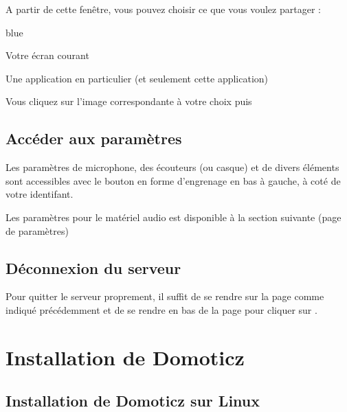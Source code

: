 {A partir de cette fenêtre, vous pouvez choisir ce que vous voulez partager : 

	\begin{items}{blue}{\Triangle}
		\item Votre écran courant
		\item Une application en particulier (et seulement cette application)
	\end{items}

	Vous cliquez sur l'image correspondante à votre choix puis 


\section{Accéder aux paramètres}

Les paramètres de microphone, des écouteurs (ou casque) et de divers éléments sont accessibles avec le bouton en forme d'engrenage en bas à gauche, à coté de votre identifant.


Les paramètres pour le matériel audio est disponible à la section suivante (page de paramètres)



\section{Déconnexion du serveur}

Pour quitter le serveur proprement, il suffit de se rendre sur la page  comme indiqué précédemment et de se rendre en bas de la page pour cliquer sur .

\newpage
{}
\chapter{Installation de Domoticz}
\section{Installation de Domoticz sur Linux}

}
